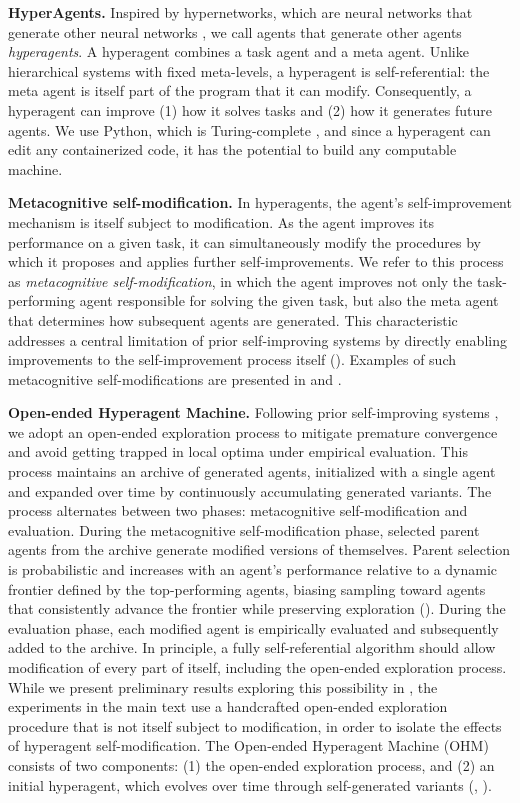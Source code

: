 \documentclass[]{fairmeta}
\begin{document}
\textbf{HyperAgents.} Inspired by hypernetworks, which are neural networks that generate other neural networks \citep{ha2017hypernetworks}, we call agents that generate other agents \textit{hyperagents}. A hyperagent combines a task agent and a meta agent. Unlike hierarchical systems with fixed meta-levels, a hyperagent is self-referential: the meta agent is itself part of the program that it can modify. Consequently, a hyperagent can improve (1) how it solves tasks and (2) how it generates future agents. We use Python, which is Turing-complete \citep{turing1936computable}, and since a hyperagent can edit any containerized code, it has the potential to build any computable machine.

\textbf{Metacognitive self-modification.} In hyperagents, the agent's self-improvement mechanism is itself subject to modification. As the agent improves its performance on a given task, it can simultaneously modify the procedures by which it proposes and applies further self-improvements. We refer to this process as \textit{metacognitive self-modification}, in which the agent improves not only the task-performing agent responsible for solving the given task, but also the meta agent that determines how subsequent agents are generated. This characteristic addresses a central limitation of prior self-improving systems \citep{zhang2025darwin} by directly enabling improvements to the self-improvement process itself (). Examples of such metacognitive self-modifications are presented in  and .

\textbf{Open-ended Hyperagent Machine.} Following prior self-improving systems \citep{zhang2025darwin, wang2025huxley}, we adopt an open-ended exploration process to mitigate premature convergence and avoid getting trapped in local optima under empirical evaluation. This process maintains an archive of generated agents, initialized with a single agent and expanded over time by continuously accumulating generated variants. The process alternates between two phases: metacognitive self-modification and evaluation. During the metacognitive self-modification phase, selected parent agents from the archive generate modified versions of themselves. Parent selection is probabilistic and increases with an agent's performance relative to a dynamic frontier defined by the top-performing agents, biasing sampling toward agents that consistently advance the frontier while preserving exploration (). During the evaluation phase, each modified agent is empirically evaluated and subsequently added to the archive. In principle, a fully self-referential algorithm should allow modification of every part of itself, including the open-ended exploration process. While we present preliminary results exploring this possibility in , the experiments in the main text use a handcrafted open-ended exploration procedure that is not itself subject to modification, in order to isolate the effects of hyperagent self-modification. The Open-ended Hyperagent Machine (OHM) consists of two components: (1) the open-ended exploration process, and (2) an initial hyperagent, which evolves over time through self-generated variants (, ).
\end{document}

